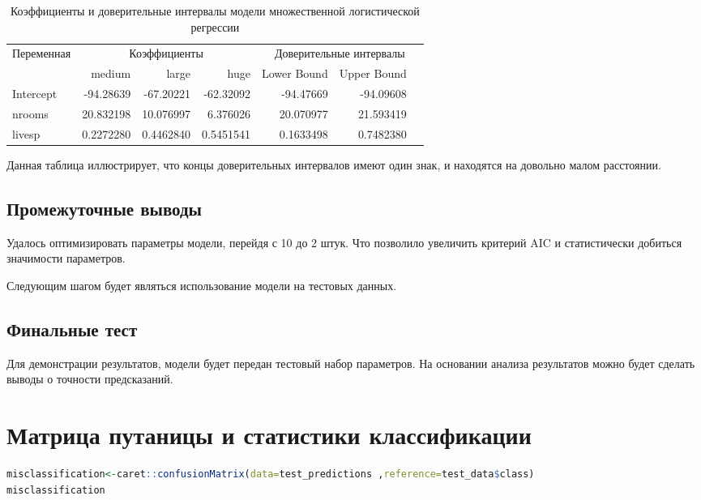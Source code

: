 \begin{table}[h]
	\centering
	\caption{Коэффициенты и доверительные интервалы модели множественной логистической регрессии}
	\begin{tabular}{@{}l|rrr|rrr@{}}
		\toprule
		Переменная & \multicolumn{3}{c|}{Коэффициенты} & \multicolumn{3}{c}{Доверительные интервалы} \\ \cmidrule{2-4} \cmidrule{5-7}
		& medium & large & huge & Lower Bound & Upper Bound \\ \midrule
		Intercept & -94.28639 & -67.20221 & -62.32092 & -94.47669 & -94.09608 \\
		nrooms    & 20.832198 & 10.076997 & 6.376026  & 20.070977 & 21.593419 \\
		livesp    & 0.2272280 & 0.4462840 & 0.5451541 & 0.1633498 & 0.7482380 \\ \bottomrule
	\end{tabular}
\end{table}
Данная таблица иллюстрирует, что концы доверительных интервалов имеют один знак, и находятся на довольно малом расстоянии.

\subsection*{Промежуточные выводы}
Удалось оптимизировать параметры модели, перейдя с 10 до 2 штук. Что позволило увеличить критерий AIC и статистически добиться значимости параметров. 

Следующим шагом будет являться использование модели на тестовых данных.

\subsection{Финальные тест}
Для демонстрации результатов, модели будет передан тестовый набор параметров. На основании анализа результатов можно будет сделать выводы о точности предсказаний.

\section*{Матрица путаницы и статистики классификации}

\begin{lstlisting}[language=R, caption={Формирование матрицы путаницы}]
misclassification<-caret::confusionMatrix(data=test_predictions ,reference=test_data$class)
misclassification
\end{lstlisting}


